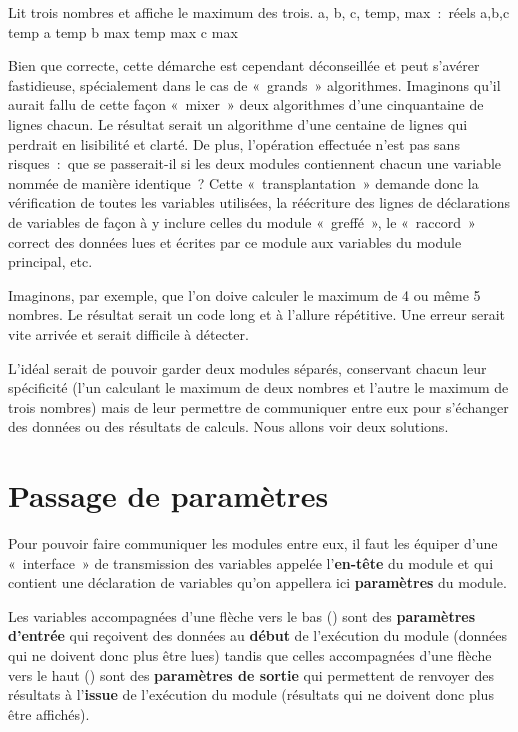 	\begin{Pseudocode}
		\RComment Lit trois nombres et affiche le maximum des trois.
		\Decl a, b, c, temp, max~:~réels
		\Read a,b,c
			\Let temp \Gets a
		\Else
			\Let temp \Gets b
		\EndIf
			\Let max \Gets temp
		\Else
			\Let max \Gets c
		\EndIf
		\Write max
	\EndModule
	\end{Pseudocode}

	Bien que correcte, cette démarche est cependant déconseillée et peut
	s’avérer fastidieuse, spécialement dans le cas de «~grands~»
	algorithmes. Imaginons qu’il aurait fallu de cette façon «~mixer~» deux
	algorithmes d’une cinquantaine de lignes chacun. Le résultat serait un
	algorithme d’une centaine de lignes qui perdrait en lisibilité et
	clarté. De plus, l’opération effectuée n’est pas sans risques~:~que se
	passerait-il si les deux modules contiennent chacun une variable nommée
	de manière identique~? Cette «~transplantation~» demande donc la
	vérification de toutes les variables utilisées, la réécriture des
	lignes de déclarations de variables de façon à y inclure celles du
	module «~greffé~», le «~raccord~» correct des données lues et écrites
	par ce module aux variables du module principal, etc.
	
	Imaginons, par exemple, que l’on doive calculer le
	maximum de 4 ou même 5 nombres. Le résultat serait un code long et
	à l’allure répétitive. Une erreur serait vite arrivée et
	serait difficile à détecter.
	
	L’idéal serait de pouvoir garder deux modules séparés, conservant chacun
	leur spécificité (l’un calculant le maximum de deux nombres et l’autre
	le maximum de trois nombres) mais de leur permettre de communiquer
	entre eux pour s’échanger des données ou des résultats de calculs. Nous
	allons voir deux solutions.

\section{Passage de paramètres}

	Pour pouvoir faire communiquer les modules entre eux, il faut les
	équiper d’une «~interface~» de transmission des variables appelée
	l’\textbf{en-tête} du module et qui contient une déclaration de
	variables qu’on appellera ici \textbf{paramètres} du module. 
	
	Les variables accompagnées d’une flèche vers le bas 
	(\pseudocode{\In}) sont des \textbf{paramètres d’entrée} 
	qui reçoivent des données au \textbf{début} de l’exécution du module 
	(données qui ne doivent donc plus être lues) 
	tandis que celles accompagnées d’une flèche vers le
	haut (\pseudocode{\Out}) 
	sont des \textbf{paramètres de sortie} qui permettent
	de renvoyer des résultats à l’\textbf{issue} de l’exécution du module
	(résultats qui ne doivent donc plus être affichés). 

